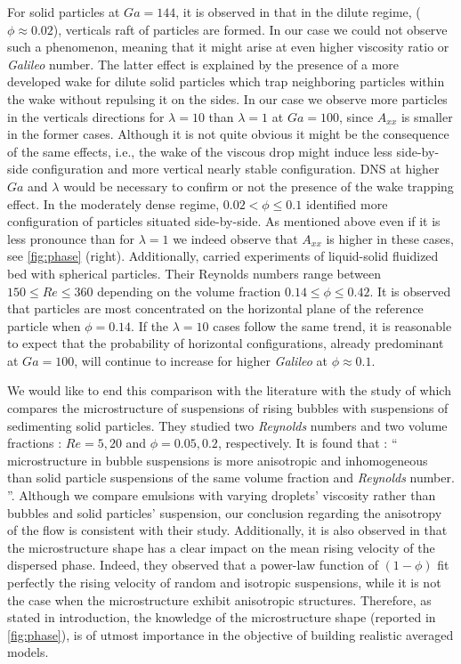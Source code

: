For solid particles at $Ga = 144$, it is observed in \citet{shajahan2023inertial} that in the dilute regime, ($\phi \approx 0.02$), verticals raft of particles are formed. 
In our case we could not observe such a phenomenon, meaning that it might arise at even higher viscosity ratio or \textit{Galileo} number. 
The latter effect is explained by the presence of a more developed wake for dilute solid particles which trap neighboring particles within the wake without repulsing it on the sides. 
In our case we observe more particles in the verticals directions for $\lambda = 10$ than $\lambda =1$ at $Ga =100$, since $A_{xx}$ is smaller in the former cases.
Although it is not quite obvious it might be the consequence of the same effects, i.e., the wake of the viscous drop might induce less side-by-side configuration and more vertical nearly stable configuration. 
DNS at higher $Ga$ and $\lambda$ would be necessary to confirm or not the presence of the wake trapping effect.  
In the moderately dense regime,  $0.02 < \phi \le 0.1$  \citet{shajahan2023inertial} identified more configuration of particles situated side-by-side. 
As mentioned above even if it is less pronounce than for $\lambda = 1$ we indeed observe that $A_{xx}$ is higher in these cases, see \ref{fig:phase} (right). 
Additionally, \citet{almeras2021statistics} carried experiments of liquid-solid fluidized bed with spherical particles. 
Their Reynolds numbers range between $150\leq Re \leq 360$ depending on the volume fraction $0.14 \leq \phi \leq 0.42$.
It is observed that particles are most concentrated on the horizontal plane of the reference particle when $\phi = 0.14$.
If the $\lambda = 10$ cases follow the same trend, it is reasonable to expect that the probability of horizontal configurations, already predominant at $Ga =100$, will continue to increase for higher \textit{Galileo} at $\phi  \approx 0.1$. 


We would like to end this comparison with the literature with the study of \citet{yin2008lattice} which compares the microstructure of suspensions of rising bubbles with suspensions of sedimenting solid particles.
They studied two \textit{Reynolds} numbers and two volume fractions : $Re = 5,20$ and  $\phi = 0.05, 0.2$, respectively.
It is found that : 
\enquote{    
     microstructure in bubble
    suspensions is more anisotropic and inhomogeneous than
    solid particle suspensions of the same volume fraction and
    \textit{Reynolds} number.    
}. 
Although we compare emulsions with varying droplets' viscosity rather than bubbles and solid particles' suspension, our conclusion regarding the anisotropy of the flow is consistent with their study.
Additionally, it is also observed in \citet{yin2008lattice} that the microstructure shape has a clear impact on the mean rising velocity of the dispersed phase.
Indeed, they observed that a power-law function of $(1-\phi)$ fit perfectly the rising velocity of random and isotropic suspensions, while it is not the case when the microstructure exhibit anisotropic structures. 
Therefore, as stated in introduction, the knowledge of the microstructure shape (reported in \ref{fig:phase}), is of utmost importance in the objective of building realistic averaged models. 

